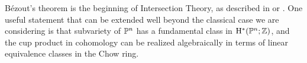 \documentclass[12pt, leqno]{book}
\def\CC{{\mathbb C}}
\begin{document}
\begin{fact}
B\'ezout's theorem is the beginning of Intersection Theory, as described in \cite{Fulton} or \cite{3264}. One useful statement that can be extended well beyond the classical case we are considering is that
subvariety of $\PP^{n}$ has a fundamental class in $\HH^{*}(\PP^{n}; \ZZ)$, and the cup product in cohomology can be realized algebraically in terms of linear equivalence classes in the Chow ring.
\end{fact}

%
%
%
%
%
%
\end{document}
